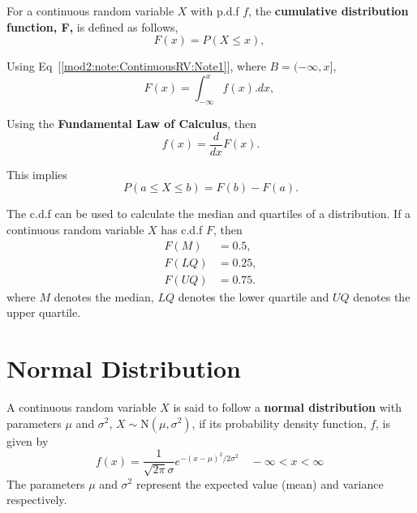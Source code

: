 \begin{defn} \label{mod2:defn:ContinuousRV:CDF}
	For a continuous random variable $X$ with p.d.f $f$,  the \textbf{cumulative distribution function, F,} is defined as follows,
	\begin{equation}
		F(x) = P(X \leq x), \
	\end{equation}
	
	Using Eq~[\ref{mod2:note:ContinuousRV:Note1}], where $B = (-\infty, x]$,
	\begin{equation}
		F(x) = \int_{-\infty}^{x} f(x).dx, \
	\end{equation}
	
	Using the \textbf{Fundamental Law of Calculus}, then
	\begin{equation}
	f(x) = \frac{d}{dx}F(x)
.	\end{equation}
	
	
\end{defn}	

\begin{note} \label{mod2:note:ContinuousRV:CDF}
	This implies
	\begin{equation}
		P( a \leq X \leq b) = F(b) - F(a).
	\end{equation}
\end{note}

\begin{prop} \label{mod2:prop:ContinuousRV:CDF}
	The c.d.f can be used to calculate the median and quartiles of a distribution. If a continuous random variable $X$ has c.d.f $F$,  then 
	\begin{align}
	F(M) &= 0.5, \\
	F(LQ) &= 0.25, \\
	F(UQ) &= 0.75.
	\end{align}	
	where $M$ denotes the median, $LQ$ denotes the lower quartile and $UQ$ denotes the upper quartile.
\end{prop}
		




\section{Normal Distribution}\label{mod2:section:Normal}

\begin{defn}\label{mod2:defn:Normal}
	A continuous random variable $X$ is said to follow a \textbf{normal distribution} with parameters $\mu$ and $\sigma^2$, $X \sim \text{N}(\mu,\sigma^2)$, if its probability density function, $f$, is given by
	\begin{equation}
	f(x) = \frac{1}{\sqrt{2 \pi}\sigma} e^{-(x-\mu)^2/2\sigma^2} \quad -\infty < x < \infty  \label{mod2:eq:Normal}\
	\end{equation}
	The parameters $\mu$ and $\sigma^2$ represent the expected value (mean) and variance respectively.
\end{defn}

